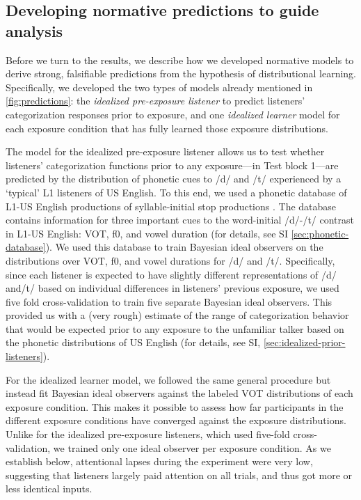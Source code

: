 \documentclass[
  11pt,
  man,mask,floatsintext]{apa6}
\begin{document}
\subsection{Developing normative predictions to guide analysis}\label{developing-normative-predictions-to-guide-analysis}

Before we turn to the results, we describe how we developed normative models to derive strong, falsifiable predictions from the hypothesis of distributional learning. Specifically, we developed the two types of models already mentioned in \ref{fig:predictions}: the \emph{idealized pre-exposure listener} to predict listeners' categorization responses prior to exposure, and one \emph{idealized learner} model for each exposure condition that has fully learned those exposure distributions.

The model for the idealized pre-exposure listener allows us to test whether listeners' categorization functions prior to any exposure---in Test block 1---are predicted by the distribution of phonetic cues to /d/ and /t/ experienced by a `typical' L1 listeners of US English. To this end, we used a phonetic database of L1-US English productions of syllable-initial stop productions \autocite{chodroff-wilson2018}. The database contains information for three important cues to the word-initial /d/-/t/ contrast in L1-US English: VOT, f0, and vowel duration (for details, see SI \ref{sec:phonetic-database}). We used this database to train Bayesian ideal observers on the distributions over VOT, f0, and vowel durations for /d/ and /t/. Specifically, since each listener is expected to have slightly different representations of /d/ and/t/ based on individual differences in listeners' previous exposure, we used five fold cross-validation to train five separate Bayesian ideal observers. This provided us with a (very rough) estimate of the range of categorization behavior that would be expected prior to any exposure to the unfamiliar talker based on the phonetic distributions of US English (for details, see SI, \ref{sec:idealized-prior-listeners}).

For the idealized learner model, we followed the same general procedure but instead fit Bayesian ideal observers against the labeled VOT distributions of each exposure condition. This makes it possible to assess how far participants in the different exposure conditions have converged against the exposure distributions. Unlike for the idealized pre-exposure listeners, which used five-fold cross-validation, we trained only one ideal observer per exposure condition. As we establish below, attentional lapses during the experiment were very low, suggesting that listeners largely paid attention on all trials, and thus got more or less identical inputs.
\end{document}
